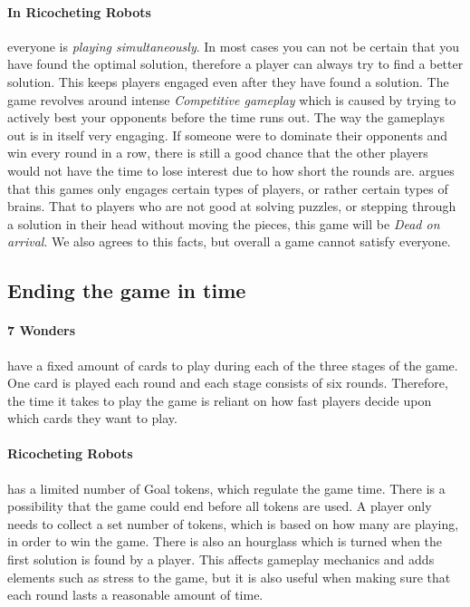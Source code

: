 \documentclass[a4paper]{article}
\begin{document}
\paragraph{In Ricocheting Robots} everyone is \textit{playing simultaneously}. In most cases you can not be certain that you have found the optimal solution, therefore a player can always try to find a better solution. This keeps players engaged even after they have found a solution. The game revolves around intense \textit{Competitive gameplay} which is caused by trying to actively best your opponents before the time runs out. The way the gameplays out is in itself very engaging. If someone were to dominate their opponents and win every round in a row, there is still a good chance that the other players would not have the time to lose interest due to how short the rounds are.  argues that this games only engages certain types of players, or rather certain types of brains. That to players who are not good at solving puzzles, or stepping through a solution in their head without moving the pieces, this game will be \textit{Dead on arrival}. We also agrees to this facts, but overall a game cannot satisfy everyone.

\subsection{Ending the game in time}
\paragraph{7 Wonders} have a fixed amount of cards to play during each of the three stages of the game. One card is played each round and each stage consists of six rounds. Therefore, the time it takes to play the game is reliant on how fast players decide upon which cards they want to play.


\paragraph{Ricocheting Robots} has a limited number of Goal tokens, which regulate the game time. There is a possibility that the game could end before all tokens are used. A player only needs to collect a set number of tokens, which is based on how many are playing, in order to win the game. There is also an hourglass which is turned when the first solution is found by a player. This affects gameplay mechanics and adds elements such as stress to the game, but it is also useful when making sure that each round lasts a reasonable amount of time. 
\end{document}
